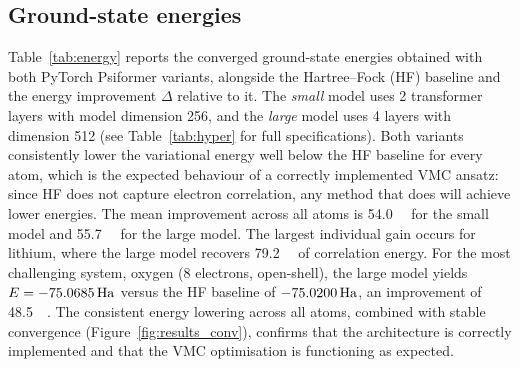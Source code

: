 \subsection{Ground-state energies}

Table~\ref{tab:energy} reports the converged ground-state energies obtained with both PyTorch Psiformer variants, alongside the Hartree--Fock (HF) baseline and the energy improvement $\Delta$ relative to it. The \emph{small} model uses 2 transformer layers with model dimension 256, and the \emph{large} model uses 4 layers with dimension 512 (see Table~\ref{tab:hyper} for full specifications). Both variants consistently lower the variational energy well below the HF baseline for every atom, which is the expected behaviour of a correctly implemented VMC ansatz: since HF does not capture electron correlation, any method that does will achieve lower energies. The mean improvement across all atoms is \SI{54.0}{\milli\ha} for the small model and \SI{55.7}{\milli\ha} for the large model. The largest individual gain occurs for lithium, where the large model recovers \SI{79.2}{\milli\ha} of correlation energy. For the most challenging system, oxygen (8 electrons, open-shell), the large model yields $E = -75.0685\,\mathrm{Ha}$ versus the HF baseline of $-75.0200\,\mathrm{Ha}$, an improvement of \SI{48.5}{\milli\ha}. The consistent energy lowering across all atoms, combined with stable convergence (Figure~\ref{fig:results_conv}), confirms that the architecture is correctly implemented and that the VMC optimisation is functioning as expected.


